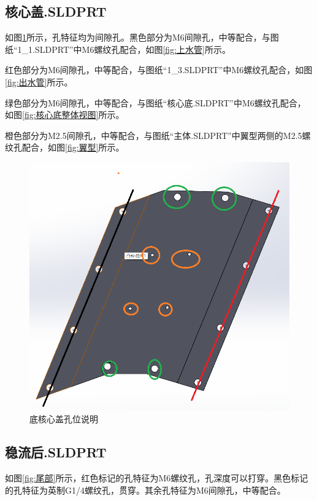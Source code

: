 \documentclass{MyLatex}
\begin{document}
\subsection{核心盖.SLDPRT}
如图\ref{fig:核心盖}所示，孔特征均为间隙孔。黑色部分为M6间隙孔，中等配合，与图纸“1\_1.SLDPRT”中M6螺纹孔配合，如图\ref{fig:上水管}所示。

红色部分为M6间隙孔，中等配合，与图纸“1\_3.SLDPRT”中M6螺纹孔配合，如图\ref{fig:出水管}所示。

绿色部分为M6间隙孔，中等配合，与图纸“核心底.SLDPRT”中M6螺纹孔配合，如图\ref{fig:核心底整体视图}所示。

橙色部分为M2.5间隙孔，中等配合，与图纸“主体.SLDPRT”中翼型两侧的M2.5螺纹孔配合，如图\ref{fig:翼型}所示。

\begin{figure}[H]
\centering
\includegraphics[width=0.8\linewidth]{./image/Zpicture/核心盖.png}
\caption{底核心盖孔位说明} \label{fig:核心盖}
\end{figure}

\subsection{稳流后.SLDPRT}
如图\ref{fig:尾部}所示，红色标记的孔特征为M6螺纹孔，孔深度可以打穿。黑色标记的孔特征为英制G1/4螺纹孔，贯穿。其余孔特征为M6间隙孔，中等配合。
\end{document}

